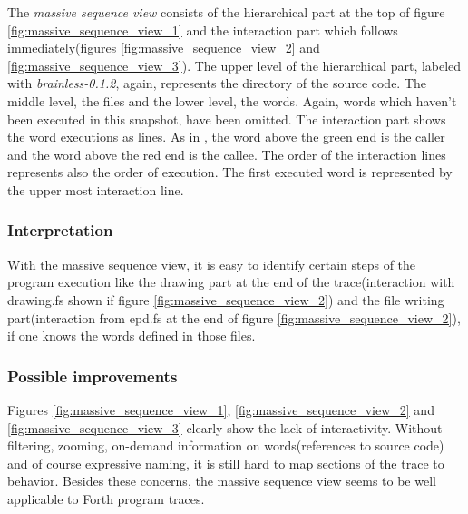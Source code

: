 The \emph{massive sequence view} consists of the hierarchical part at the top of figure \ref{fig:massive_sequence_view_1} and the interaction part which follows immediately(figures \ref{fig:massive_sequence_view_2} and \ref{fig:massive_sequence_view_3}). The upper level of the hierarchical part, labeled with \emph{brainless-0.1.2}, again, represents the directory of the source code. The middle level, the files and the lower level, the words. Again, words which haven't been executed in this snapshot, have been omitted.
The interaction part shows the word executions as lines. As in \cite{Holten:2006:HEB:1187627.1187772}, the word above the green end is the caller and the word above the red end is the callee. The order of the interaction lines represents also the order of execution. The first executed word is represented by the upper most interaction line.

\subsubsection*{Interpretation}

With the massive sequence view, it is easy to identify certain steps of the program execution like the drawing part at the end of the trace(interaction with drawing.fs shown if figure \ref{fig:massive_sequence_view_2}) and the file writing part(interaction from epd.fs at the end of figure \ref{fig:massive_sequence_view_2}), if one knows the words defined in those files.

\subsubsection*{Possible improvements}

Figures \ref{fig:massive_sequence_view_1}, \ref{fig:massive_sequence_view_2} and \ref{fig:massive_sequence_view_3} clearly show the lack of interactivity. Without filtering, zooming, on-demand information on words(references to source code) and of course expressive naming, it is still hard to map sections of the trace to behavior. Besides these concerns, the massive sequence view seems to be well applicable to Forth program traces.

